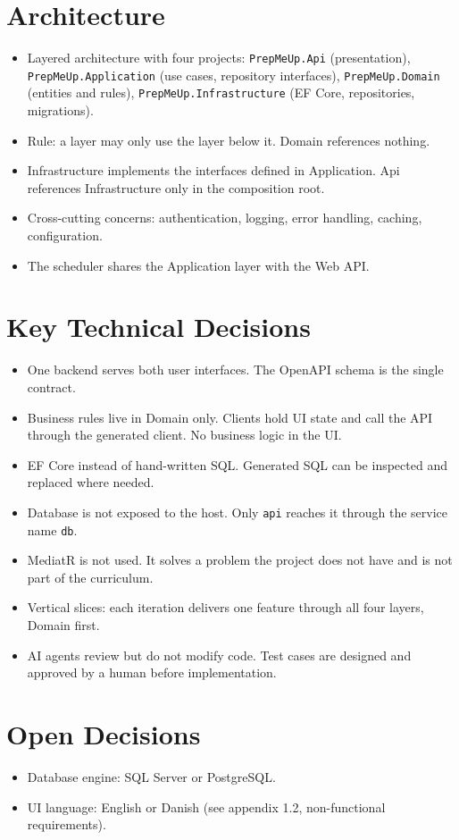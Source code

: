 \documentclass[a4paper,11pt]{article}
\begin{document}
\section{Architecture}
\begin{itemize}
    \item Layered architecture with four projects: \texttt{PrepMeUp.Api} (presentation), \texttt{PrepMeUp.Application} (use cases, repository interfaces), \texttt{PrepMeUp.Domain} (entities and rules), \texttt{PrepMeUp.Infrastructure} (EF Core, repositories, migrations).
    \item Rule: a layer may only use the layer below it. Domain references nothing.
    \item Infrastructure implements the interfaces defined in Application. Api references Infrastructure only in the composition root.
    \item Cross-cutting concerns: authentication, logging, error handling, caching, configuration.
    \item The scheduler shares the Application layer with the Web API.
\end{itemize}

\section{Key Technical Decisions}
\begin{itemize}
    \item One backend serves both user interfaces. The OpenAPI schema is the single contract.
    \item Business rules live in Domain only. Clients hold UI state and call the API through the generated client. No business logic in the UI.
    \item EF Core instead of hand-written SQL. Generated SQL can be inspected and replaced where needed.
    \item Database is not exposed to the host. Only \texttt{api} reaches it through the service name \texttt{db}.
    \item MediatR is not used. It solves a problem the project does not have and is not part of the curriculum.
    \item Vertical slices: each iteration delivers one feature through all four layers, Domain first.
    \item AI agents review but do not modify code. Test cases are designed and approved by a human before implementation.
\end{itemize}

\section{Open Decisions}
\begin{itemize}
    \item Database engine: SQL Server or PostgreSQL.
    \item UI language: English or Danish (see appendix 1.2, non-functional requirements).
\end{itemize}
\end{document}
